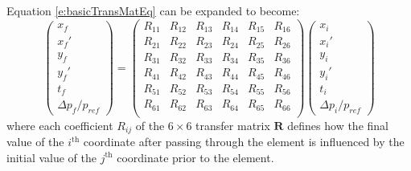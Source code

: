 Equation \ref{e:basicTransMatEq} can be expanded to become:
\begin{equation}
\left( \begin{array}{c} x_f \\ x_f' \\ y_f \\ y_f' \\ t_f \\ \Delta p_f/p_{ref} \end{array} \right)
=
\left( \begin{array}{cccccc} 
R_{11} & R_{12} & R_{13} & R_{14} & R_{15} & R_{16}\\ 
R_{21} & R_{22} & R_{23} & R_{24}  & R_{25} & R_{26}\\ 
R_{31} & R_{32} & R_{33} & R_{34}  & R_{35} & R_{36}\\
R_{41} & R_{42} & R_{43} & R_{44}  & R_{45} & R_{46}\\
R_{51} & R_{52} & R_{53} & R_{54}  & R_{55} & R_{56}\\
R_{61} & R_{62} & R_{63} & R_{64}  & R_{65} & R_{66}\\
\end{array} \right)
\left( \begin{array}{c} x_i \\ x_i' \\ y_i \\ y_i' \\ t_i \\ \Delta p_i/p_{ref} \end{array} \right)
\end{equation}
where each coefficient \(R_{ij}\) of the \(6\times6\) transfer matrix \(\mathbf{R}\) defines how the final value of the \(i^{\mathrm{th}}\) coordinate after passing through the element is influenced by the initial value of the \(j^{\mathrm{th}}\) coordinate prior to the element.

